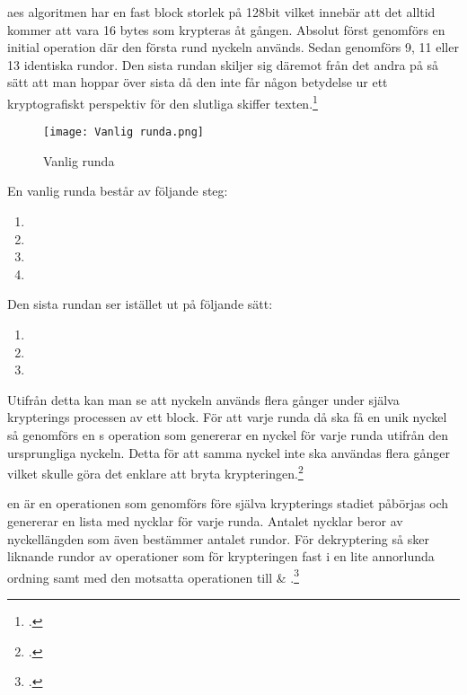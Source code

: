 \acrshort{aes} algoritmen har en fast block storlek på 128bit vilket innebär att
det alltid kommer att vara 16 \glspl{byte} som krypteras åt gången. Absolut först genomförs
en initial  operation där den första rund nyckeln används.
Sedan genomförs 9, 11 eller 13 identiska rundor. Den sista rundan skiljer sig däremot från det andra
på så sätt att man hoppar över sista  då den inte får någon betydelse ur ett
kryptografiskt perspektiv för den slutliga skiffer texten.\footcite{daemen1999aes}

\begin{wrapfigure}{r}{0.5\textwidth}
    \centering
    \texttt{[image: Vanlig runda.png]}
    \caption{Vanlig runda}
    \label{fig:round-function}
\end{wrapfigure}

En vanlig runda består av följande steg:

\begin{enumerate}
    \item {}
    \item {}
    \item {}
    \item {}
\end{enumerate}

Den sista rundan ser istället ut på följande sätt:

\begin{enumerate}
    \item {}
    \item {}
    \item {}
\end{enumerate}

Utifrån detta kan man se att nyckeln används flera gånger under själva krypterings processen av ett block.
För att varje runda då ska få en unik nyckel så genomförs en s operation
som genererar en nyckel för varje runda utifrån den ursprungliga nyckeln. Detta för att samma nyckel
inte ska användas flera gånger vilket skulle göra det enklare att bryta krypteringen.\footcite{daemen1999aes}

en är en operationen som genomförs före själva krypterings stadiet påbörjas
och genererar en lista med nycklar för varje runda. Antalet nycklar beror av nyckellängden som även bestämmer antalet rundor.
För dekryptering så sker liknande rundor av operationer som för krypteringen fast
i en lite annorlunda ordning samt med den motsatta operationen till  \& .\footcite{daemen1999aes}

